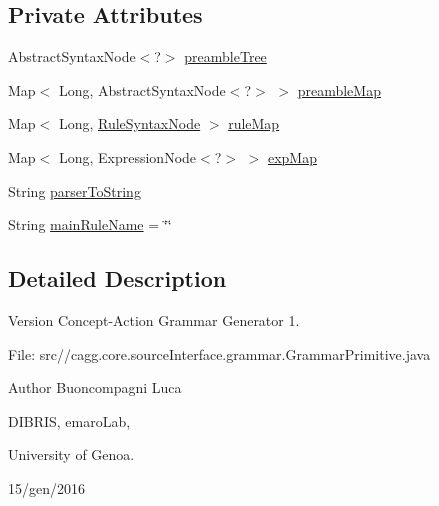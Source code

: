 \subsection*{Private Attributes}
\begin{DoxyCompactItemize}
\item 
Abstract\-Syntax\-Node$<$?$>$ \hyperlink{classit_1_1emarolab_1_1cagg_1_1core_1_1language_1_1syntax_1_1GrammarPrimitive_a5dd8a9ff244cc578bdc548f23514bbb6}{preamble\-Tree}
\item 
Map$<$ Long, Abstract\-Syntax\-Node$<$?$>$ $>$ \hyperlink{classit_1_1emarolab_1_1cagg_1_1core_1_1language_1_1syntax_1_1GrammarPrimitive_a16aa03b3d1b8f106c3c5a38272956bb3}{preamble\-Map}
\item 
Map$<$ Long, \hyperlink{classit_1_1emarolab_1_1cagg_1_1core_1_1language_1_1syntax_1_1abstractTree_1_1syntaxNodeType_1_1RuleSyntaxNode}{Rule\-Syntax\-Node} $>$ \hyperlink{classit_1_1emarolab_1_1cagg_1_1core_1_1language_1_1syntax_1_1GrammarPrimitive_a1c9fa16adecc71a44b6d893f62dba053}{rule\-Map}
\item 
Map$<$ Long, Expression\-Node$<$?$>$ $>$ \hyperlink{classit_1_1emarolab_1_1cagg_1_1core_1_1language_1_1syntax_1_1GrammarPrimitive_aed9c254771deaa4a47cf504596fec771}{exp\-Map}
\item 
String \hyperlink{classit_1_1emarolab_1_1cagg_1_1core_1_1language_1_1syntax_1_1GrammarPrimitive_aefab4946b59e4707d3ee91b6a7f7d212}{parser\-To\-String}
\item 
String \hyperlink{classit_1_1emarolab_1_1cagg_1_1core_1_1language_1_1syntax_1_1GrammarPrimitive_ac2880e8b66a3f5939cafea840b34e014}{main\-Rule\-Name} = \char`\"{}\char`\"{}
\end{DoxyCompactItemize}


\subsection{Detailed Description}
\begin{DoxyVersion}{Version}
Concept-\/\-Action Grammar Generator 1. \par
 File\-: src//cagg.core.\-source\-Interface.\-grammar.\-Grammar\-Primitive.\-java \par

\end{DoxyVersion}
\begin{DoxyAuthor}{Author}
Buoncompagni Luca \par
 D\-I\-B\-R\-I\-S, emaro\-Lab,\par
 University of Genoa. \par
 15/gen/2016 \par

\end{DoxyAuthor}


